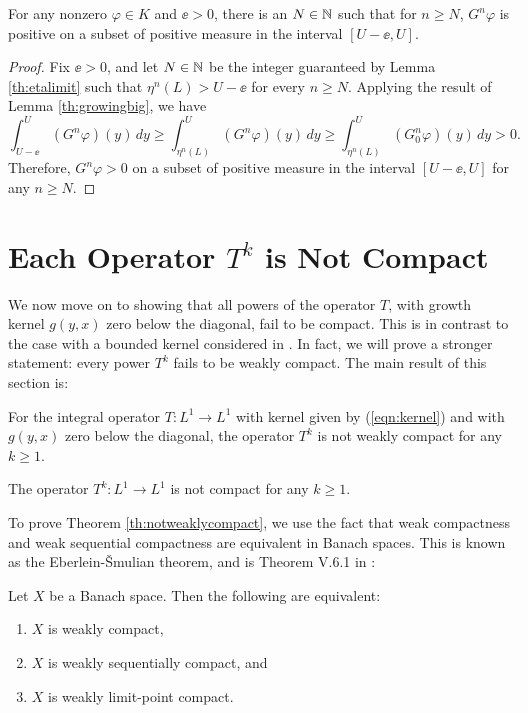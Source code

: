 \begin{corollary} \label{th:cortogrowingbig}
	For any nonzero $\varphi \in K$ and $\ee > 0$, there is an $N \in \mathbb{N}$ such that for $n \geq N$, $G^n\varphi$ is positive on a subset of positive measure in the interval $[U - \ee, U]$.
\end{corollary}

\begin{proof}
	Fix $\ee > 0$, and let $N \in \mathbb{N}$ be the integer guaranteed by Lemma \ref{th:etalimit} such that $\eta^n(L) > U - \ee$ for every $n \geq N$. Applying the result of Lemma \ref{th:growingbig}, we have
	\[\int_{U - \ee}^U (G^n \varphi)(y) \, dy \geq \int_{\eta^n(L)}^U (G^n \varphi)(y) \, dy \geq \int_{\eta^n(L)}^U (G_0^n \varphi)(y) \, dy > 0.\]
	Therefore, $G^n\varphi>0$ on a subset of positive measure in the interval $[U - \ee, U]$ for any $n \geq N$. 
\end{proof}

\section{Each Operator $T^k$ is Not Compact} \label{section:noncompactness}

We now  move on to showing that all powers of the operator $T$, with growth kernel $g(y, x)$ zero below the diagonal, fail to be compact. This is in contrast to the case with a bounded kernel considered in \cite{Ellner2006}. In fact, we will prove a stronger statement: every power $T^k$ fails to be weakly compact. The main result of this section is:

\begin{theorem} \label{th:notweaklycompact}
	For the integral operator $T:L^1 \to L^1$ with kernel given by (\ref{eqn:kernel}) and with $g(y,x)$ zero below the diagonal, the operator $T^k$ is not weakly compact for any $k \geq 1$.
\end{theorem}

\begin{corollary} \label{th:corollarytonotweaklycompact}
	The operator $T^k:L^1 \to L^1$ is not compact for any $k \geq 1$.
\end{corollary}

To prove Theorem \ref{th:notweaklycompact}, we use the fact that weak compactness and weak sequential compactness are equivalent in Banach spaces. This is known as the Eberlein-\v{S}mulian theorem, and is Theorem V.6.1 in \cite{Dunford1958}:

\begin{theorem} \label{th:eberlein}
	Let $X$ be a Banach space. Then the following are equivalent:
	\begin{enumerate}
		\item $X$ is weakly compact,
		\item $X$ is weakly sequentially compact, and
		\item $X$ is weakly limit-point compact.
	\end{enumerate}
\end{theorem}

